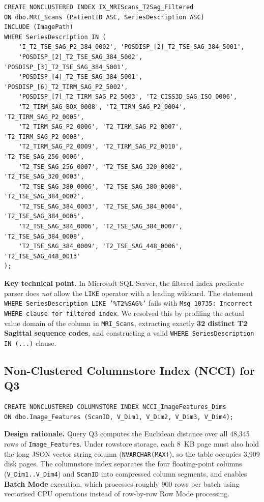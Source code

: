 \begin{lstlisting}[caption={Filtered Index for T2 Sagittal sequences}, label={lst:filtered}]
CREATE NONCLUSTERED INDEX IX_MRIScans_T2Sag_Filtered
ON dbo.MRI_Scans (PatientID ASC, SeriesDescription ASC)
INCLUDE (ImagePath)
WHERE SeriesDescription IN (
    'I_T2_TSE_SAG_P2_384_0002', 'POSDISP_[2]_T2_TSE_SAG_384_5001',
    'POSDISP_[2]_T2_TSE_SAG_384_5002', 'POSDISP_[3]_T2_TSE_SAG_384_5001',
    'POSDISP_[4]_T2_TSE_SAG_384_5001', 'POSDISP_[6]_T2_TIRM_SAG_P2_5002',
    'POSDISP_[7]_T2_TIRM_SAG_P2_5003', 'T2_CISS3D_SAG_ISO_0006',
    'T2_TIRM_SAG_BOX_0008', 'T2_TIRM_SAG_P2_0004', 'T2_TIRM_SAG_P2_0005',
    'T2_TIRM_SAG_P2_0006', 'T2_TIRM_SAG_P2_0007', 'T2_TIRM_SAG_P2_0008',
    'T2_TIRM_SAG_P2_0009', 'T2_TIRM_SAG_P2_0010', 'T2_TSE_SAG_256_0006',
    'T2_TSE_SAG_256_0007', 'T2_TSE_SAG_320_0002', 'T2_TSE_SAG_320_0003',
    'T2_TSE_SAG_380_0006', 'T2_TSE_SAG_380_0008', 'T2_TSE_SAG_384_0002',
    'T2_TSE_SAG_384_0003', 'T2_TSE_SAG_384_0004', 'T2_TSE_SAG_384_0005',
    'T2_TSE_SAG_384_0006', 'T2_TSE_SAG_384_0007', 'T2_TSE_SAG_384_0008',
    'T2_TSE_SAG_384_0009', 'T2_TSE_SAG_448_0006', 'T2_TSE_SAG_448_0013'
);
\end{lstlisting}

\textbf{Key technical point.} In Microsoft SQL Server, the filtered index predicate parser does \emph{not} allow the \texttt{LIKE} operator with a leading wildcard. The statement \texttt{WHERE SeriesDescription LIKE '\%T2\%SAG\%'} fails with \texttt{Msg 10735: Incorrect WHERE clause for filtered index}. We resolved this by profiling the actual value domain of the column in \texttt{MRI\_Scans}, extracting exactly \textbf{32 distinct T2 Sagittal sequence codes}, and constructing a valid \texttt{WHERE SeriesDescription IN (...)} clause.

\subsection{Non-Clustered Columnstore Index (NCCI) for Q3}

\begin{lstlisting}[caption={Non-Clustered Columnstore Index on \texttt{Image\_Features}}, label={lst:ncci}]
CREATE NONCLUSTERED COLUMNSTORE INDEX NCCI_ImageFeatures_Dims
ON dbo.Image_Features (ScanID, V_Dim1, V_Dim2, V_Dim3, V_Dim4);
\end{lstlisting}

\textbf{Design rationale.} Query Q3 computes the Euclidean distance over all 48,345 rows of \texttt{Image\_Features}. Under rowstore storage, each 8~KB page must also hold the long JSON vector string column (\texttt{NVARCHAR(MAX)}), so the table occupies 3,909 disk pages. The columnstore index separates the four floating-point columns (\texttt{V\_Dim1..V\_Dim4}) and \texttt{ScanID} into compressed column segments, and enables \textbf{Batch Mode} execution, which processes roughly 900 rows per batch using vectorised CPU operations instead of row-by-row Row Mode processing.

